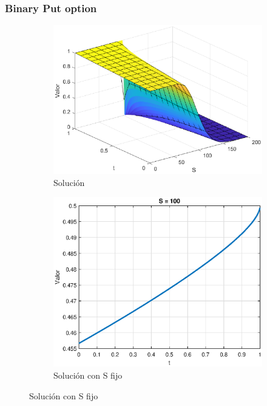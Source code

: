 \subsubsection{Binary Put option}
\begin{figure}[H]
    \centering
    \begin{subfigure}[b]{0.35\linewidth}
        \includegraphics[width=\linewidth]{Imagenes/6_Sols/Binary_Put/BinaryPut3D.eps}
        \caption{Solución}
    \end{subfigure}
    \begin{subfigure}[b]{0.35\linewidth}
        \includegraphics[width=\linewidth]{Imagenes/6_Sols/Binary_Put/BinaryPutSFijo.eps}
        \caption{Solución con S fijo}

\end{subfigure}
\end{figure}
